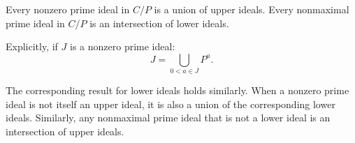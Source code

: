 Every nonzero prime ideal in $C/P$ is a union of upper ideals. Every nonmaximal prime ideal in $C/P$ is an intersection of lower ideals.

Explicitly, if $J$ is a nonzero prime ideal:
$$J = \bigcup_{0 < a \in J} P^a.$$

The corresponding result for lower ideals holds similarly. When a nonzero prime ideal is not itself an upper ideal, it is also a union of the corresponding lower ideals. Similarly, any nonmaximal prime ideal that is not a lower ideal is an intersection of upper ideals.
